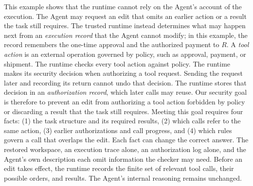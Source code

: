 This example shows that the runtime cannot rely on the Agent's account of the execution.
The Agent may request an edit that omits an earlier action or a result the task still requires.
The trusted runtime instead determines what may happen next from an \emph{execution record} that the Agent cannot modify; in this example, the record remembers the one-time approval and the authorized payment to \(R\).
A \emph{tool action} is an external operation governed by policy, such as approval, payment, or shipment.
The runtime checks every tool action against policy.
The runtime makes its security decision when authorizing a tool request.
Sending the request later and recording its return cannot undo that decision.
The runtime stores that decision in an \emph{authorization record}, which later calls may reuse.
Our security goal is therefore to prevent an edit from authorizing a tool action forbidden by policy or discarding a result that the task still requires.
Meeting this goal requires four facts: (1) the task structure and its required results, (2) which calls refer to the same action, (3) earlier authorizations and call progress, and (4) which rules govern a call that overlaps the edit.
Each fact can change the correct answer.
The restored workspace, an execution trace alone, an authorization log alone, and the Agent's own description each omit information the checker may need.
Before an edit takes effect, the runtime records the finite set of relevant tool calls, their possible orders, and results.
The Agent's internal reasoning remains unchanged.

